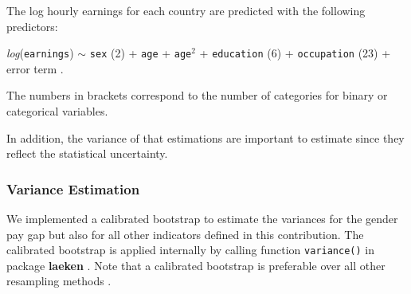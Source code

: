 \documentclass[12pt]{article}
\newcommand{\pkg}[1]{\textbf{#1}}
\begin{document}
The log hourly earnings for each country are predicted with the following
predictors:
\begin{center}
\textit{log}(\texttt{earnings}) $\sim$ \texttt{sex} (2) + \texttt{age}  +
\texttt{age$^2$} + 
\texttt{education} (6) + \texttt{occupation} (23) + error term \quad .
\end{center}
The numbers in brackets correspond to the number of categories for binary or
categorical variables. 








In addition, the variance of that estimations are important to estimate since they reflect the statistical uncertainty. 

\subsubsection{Variance Estimation}

We
implemented a calibrated bootstrap to estimate the variances \citep{templ11b}
for the gender pay gap but also for all other indicators defined in this
contribution. The calibrated bootstrap is applied internally by calling function
\texttt{variance()} in package \pkg{laeken} \citep{AMELI-D10-3}. 
Note that a calibrated bootstrap is preferable over all other resampling methods \citep{AMELI-D3-1,templ11b}.
\end{document}
